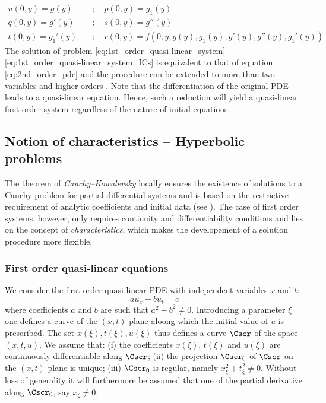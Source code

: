 \begin{equation}
  \label{eq:1st_order_quasi-linear_system_ICs}
  \begin{aligned}
    u(0,y) = g(y) \quad & ; \quad     p(0,y) = g_1(y) \\
    q(0,y) = g'(y) \quad & ; \quad    s(0,y) = g''(y) \\
    t(0,y) = g_1'(y) \quad & ; \quad    r(0,y) = f(0,y,g(y),g_1(y),g'(y),g''(y),g_1'(y))
  \end{aligned}
\end{equation}
The solution of problem \eqref{eq:1st_order_quasi-linear_system}--\eqref{eq:1st_order_quasi-linear_system_ICs}  is equivalent to that of equation \eqref{eq:2nd_order_pde} and the procedure can be extended to more than two variables and higher orders \cite[p.54]{PDEs}. Note that the differentiation of the original PDE leads to a quasi-linear equation. Hence, such a reduction will yield a quasi-linear first order system regardless of the nature of initial equations.

\subsection{Notion of characteristics -- Hyperbolic problems}
The theorem of \textit{Cauchy--Kowalevsky} locally ensures the existence of solutions to a Cauchy problem for partial differential systems and is based on the restrictive requirement of analytic coefficients and initial data (see \cite[p.46]{PDEs}). The case of first order systems, however, only requires continuity and differentiability conditions and lies on the concept of \textit{characteristics}, which makes the developement of a solution procedure more flexible.

\subsubsection*{First order quasi-linear equations}
We consider the first order quasi-linear PDE with independent variables $x$ and $t$:
\begin{equation}
  \label{eq:1st_order_pde}
   a u_x + b u_t  = c
\end{equation}
where coefficients $a$ and $b$ are such that $a^2 + b^2 \neq 0$. Introducing a parameter $\xi$ one defines a curve of the $(x,t)$ plane aloong which the initial value of $u$ is prescribed. The set $x(\xi),t(\xi),u(\xi)$ thus defines a curve $\Cscr$ of the space $(x,t,u)$. We assume that: (i) the coefficients $x(\xi)$, $t(\xi)$ and $u(\xi)$ are continuously differentiable along $\Cscr$; (ii) the projection $\Cscr_0$ of $\Cscr$ on the $(x,t)$ plane is unique; (iii) $\Cscr_0$ is regular, namely $x_\xi^2 + t_\xi^2 \neq 0$. Without loss of generality it will furthermore be assumed that one of the partial derivative along $\Cscr_0$, say $x_\xi \neq 0$.

